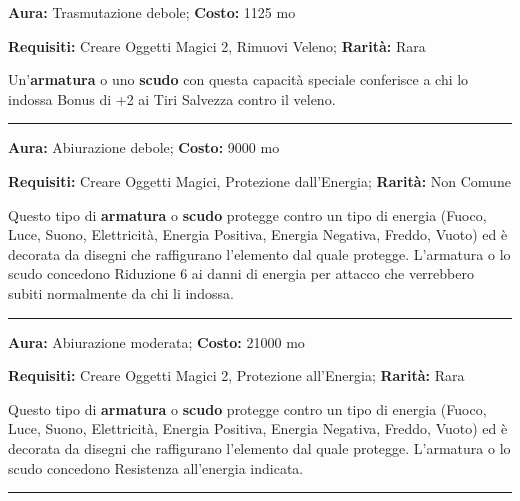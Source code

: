 \begin{multicols}{2}
\textbf{Aura:} Trasmutazione debole; \textbf{Costo:} 1125 mo

\textbf{Requisiti:} Creare Oggetti Magici 2, Rimuovi Veleno; \textbf{Rarità:} Rara

Un'\textbf{armatura} o uno \textbf{scudo} con questa capacità speciale conferisce a chi lo indossa Bonus di +2 ai Tiri Salvezza contro il veleno.

\smallskip\noindent\rule{\linewidth}{2pt}  \hypertarget{Resistenzaall'Energia}{}\medskip{}\noindent\label{Resistenzaall'Energia}

\textbf{Aura:} Abiurazione debole; \textbf{Costo:} 9000 mo

\textbf{Requisiti:} Creare Oggetti Magici, Protezione dall'Energia; \textbf{Rarità:} Non Comune

Questo tipo di \textbf{armatura} o \textbf{scudo} protegge contro un tipo di energia (Fuoco, Luce, Suono, Elettricità, Energia Positiva, Energia Negativa, Freddo, Vuoto) ed è decorata da disegni che raffigurano l'elemento dal quale protegge. L'armatura o lo scudo concedono Riduzione 6 ai danni di energia per attacco che verrebbero subiti normalmente da chi li indossa.

\smallskip\noindent\rule{\linewidth}{2pt}  \hypertarget{Resistenzaall'EnergiaSuperiore}{}\medskip{}\noindent\label{Resistenzaall'EnergiaSuperiore}

\textbf{Aura:} Abiurazione moderata; \textbf{Costo:} 21000 mo

\textbf{Requisiti:} Creare Oggetti Magici 2, Protezione all'Energia; \textbf{Rarità:} Rara

Questo tipo di \textbf{armatura} o \textbf{scudo} protegge contro un tipo di energia (Fuoco, Luce, Suono, Elettricità, Energia Positiva, Energia Negativa, Freddo, Vuoto) ed è decorata da disegni che raffigurano l'elemento dal quale protegge. L'armatura o lo scudo concedono Resistenza all'energia indicata.


\smallskip\noindent\rule{\linewidth}{2pt}  \hypertarget{ReteIntralciante}{}\medskip{}\noindent\label{ReteIntralciante}


\end{multicols}
